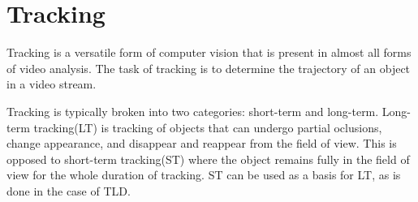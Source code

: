 \section{Tracking}
  Tracking is a versatile form of computer vision that is present in almost all forms of video analysis.
  The task of tracking is to determine the trajectory of an object in a video stream.
  
  Tracking is typically broken into two categories: short-term and long-term.
  Long-term tracking(LT) is tracking of objects that can undergo partial oclusions, change appearance, and disappear and reappear from the field of view.
  This is opposed to short-term tracking(ST) where the object remains fully in the field of view for the whole duration of tracking.
  ST can be used as a basis for LT, as is done in the case of TLD.
  
  
  
  
